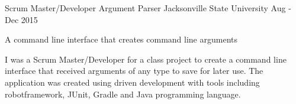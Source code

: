 
\begin{cventries}
  \cventry
    {Scrum Master/Developer} %
    {Argument Parser} %
    {Jacksonville State University} %
    {Aug - Dec 2015} %
    {
      \begin{cvitems} %
        \item {A command line interface that creates command line arguments}
		\item {I was a Scrum Master/Developer for a class project to create a command line interface that received arguments of any type to save for later use. The application was created using driven development with tools including robotframework, JUnit, Gradle and Java programming language.}
      \end{cvitems}
    }
\end{cventries}
